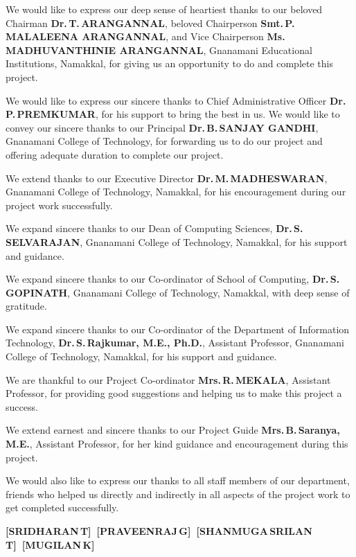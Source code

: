 \documentclass[12pt,a4paper]{report}
\begin{document}
{\fontsize{12}{18}\selectfont\singlespacing\setlength{\parskip}{8pt}
\vspace{10pt}

We would like to express our deep sense of heartiest thanks to our beloved Chairman
\textbf{Dr.\,T.\,ARANGANNAL}, beloved Chairperson \textbf{Smt.\,P.\,MALALEENA ARANGANNAL}, and
Vice Chairperson \textbf{Ms.\,MADHUVANTHINIE ARANGANNAL}, Gnanamani Educational
Institutions, Namakkal, for giving us an opportunity to do and complete this project.

We would like to express our sincere thanks to Chief Administrative Officer
\textbf{Dr.\,P.\,PREMKUMAR}, for his support to bring the best in us. We would like to
convey our sincere thanks to our Principal \textbf{Dr.\,B.\,SANJAY GANDHI}, Gnanamani
College of Technology, for forwarding us to do our project and offering adequate
duration to complete our project.

We extend thanks to our Executive Director \textbf{Dr.\,M.\,MADHESWARAN}, Gnanamani
College of Technology, Namakkal, for his encouragement during our project work
successfully.

We expand sincere thanks to our Dean of Computing Sciences, \textbf{Dr.\,S.\,SELVARAJAN},
Gnanamani College of Technology, Namakkal, for his support and guidance.

We expand sincere thanks to our Co-ordinator of School of Computing,
\textbf{Dr.\,S.\,GOPINATH}, Gnanamani College of Technology, Namakkal, with deep sense of
gratitude.

We expand sincere thanks to our Co-ordinator of the Department of Information
Technology, \textbf{Dr.\,S.\,Rajkumar, M.E., Ph.D.}, Assistant Professor,
Gnanamani College of Technology, Namakkal, for his support and guidance.

We are thankful to our Project Co-ordinator \textbf{Mrs.\,R.\,MEKALA}, Assistant
Professor, for providing good suggestions and helping us to make this project a
success.

We extend earnest and sincere thanks to our Project Guide
\textbf{Mrs.\,B.\,Saranya, M.E.}, Assistant Professor, for her kind guidance and
encouragement during this project.

We would also like to express our thanks to all staff members of our department,
friends who helped us directly and indirectly in all aspects of the project work to
get completed successfully.

\vspace{6\baselineskip}
\noindent\hfill\mbox{\textbf{[SRIDHARAN\,T] [PRAVEENRAJ\,G] [SHANMUGA\,SRILAN\,T] [MUGILAN\,K]}}

}
\end{document}
